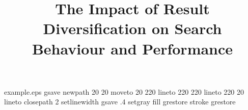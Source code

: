 %
%
%
%
%
\begin{filecontents*}{example.eps}
gsave
newpath
  20 20 moveto
  20 220 lineto
  220 220 lineto
  220 20 lineto
closepath
2 setlinewidth
gsave
  .4 setgray fill
grestore
stroke
grestore
\end{filecontents*}
%
\RequirePackage{fix-cm}
%
\documentclass[smallextended]{svjour3}       %
%
\smartqed  %
%

\usepackage{url}
\usepackage{color}
\usepackage{graphics,graphicx}
\usepackage{epsfig}
\usepackage{epstopdf}
\usepackage{colortbl}
\usepackage{multirow}
\usepackage{booktabs}
\usepackage{ifthen}  
\usepackage{rotating}
\usepackage{tabularx}
\usepackage{tabulary}
\usepackage{array}
\usepackage{enumitem}
\usepackage{textcomp}
\usepackage{amsmath}
\usepackage{adjustbox}
\usepackage[]{algorithm2e}
%
%
%
%
%

\newcommand{\ym}[1]{\textcolor{blue}{#1}}
\newcommand{\todo}[1]{\textcolor{red}{#1}}
\newcommand{\anon}[1]{\textcolor{black}{~(anon.)}}
\newcommand{\anoncite}[1]{\textcolor{black}{[anon.]}}



\title{The Impact of Result Diversification on Search Behaviour and Performance}

